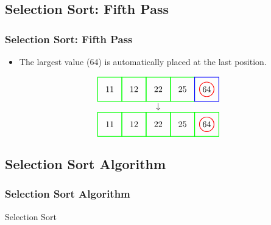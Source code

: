 \documentclass{beamer}
\begin{document}
\subsection{Selection Sort: Fifth Pass}
\begin{frame}[c, fragile]
\frametitle{Selection Sort: Fifth Pass}

\begin{itemize}
    \item The largest value (64) is automatically placed at the last position.
\end{itemize}

\[
\begin{array}{c}
\begin{tikzpicture}[baseline=(current bounding box.center)]
    \node at (0,0) {11};
    \node at (1,0) {12};
    \node at (2,0) {22};
    \node at (3,0) {25};
    \node at (4,0) {64};
    \draw[red, thick] (4,0) circle (0.3);
    \draw[green, thick] (-0.5,-0.5) rectangle (0.5,0.5);
    \draw[green, thick] (0.5,-0.5) rectangle (1.5,0.5);
    \draw[green, thick] (1.5,-0.5) rectangle (2.5,0.5);
    \draw[green, thick] (2.5,-0.5) rectangle (3.5,0.5);
    \draw[blue, thick] (3.5,-0.5) rectangle (4.5,0.5);
\end{tikzpicture} \\
\downarrow \\
\begin{tikzpicture}[baseline=(current bounding box.center)]
    \node at (0,0) {11};
    \node at (1,0) {12};
    \node at (2,0) {22};
    \node at (3,0) {25};
    \node at (4,0) {64};
    \draw[red, thick] (4,0) circle (0.3);
    \draw[green, thick] (-0.5,-0.5) rectangle (0.5,0.5);
    \draw[green, thick] (0.5,-0.5) rectangle (1.5,0.5);
    \draw[green, thick] (1.5,-0.5) rectangle (2.5,0.5);
    \draw[green, thick] (2.5,-0.5) rectangle (3.5,0.5);
    \draw[green, thick] (3.5,-0.5) rectangle (4.5,0.5);
\end{tikzpicture}
\end{array}
\]

\end{frame}

\subsection{Selection Sort Algorithm}
\begin{frame}[fragile]
\frametitle{Selection Sort Algorithm}


\begin{algorithm}[H]
\caption{Selection Sort}
\label{algo:selectionsort}

\end{algorithm}

\end{frame}
\end{document}
